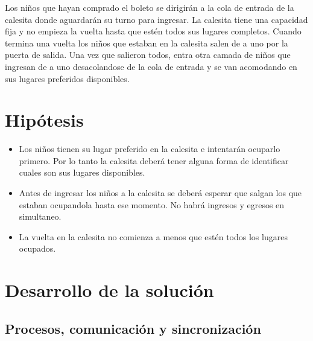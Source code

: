 \documentclass[a4paper,10pt]{article}
\begin{document}
Los niños que hayan comprado el boleto se dirigirán a la cola de entrada de la calesita donde aguardarán su turno para ingresar.
La calesita tiene una capacidad fija y no empieza la vuelta hasta que estén todos sus lugares completos.
Cuando termina una vuelta los niños que estaban en la calesita salen de a uno por la puerta de salida. Una vez que salieron todos, entra otra camada de niños que ingresan de a uno desacolandose de la cola de entrada y se van acomodando en sus lugares preferidos disponibles.


\section{Hipótesis}

\begin{itemize}
\item Los niños tienen su lugar preferido en la calesita e intentarán ocuparlo primero. Por lo tanto la calesita deberá tener alguna forma de identificar cuales son sus lugares disponibles.
\item Antes de ingresar los niños a la calesita se deberá esperar que salgan los que estaban ocupandola hasta ese momento. No habrá ingresos y egresos en simultaneo.
\item La vuelta en la calesita no comienza a menos que estén todos los lugares ocupados.
\end{itemize}

\clearpage
\section{Desarrollo de la solución}

\subsection{Procesos, comunicación y sincronización}
\end{document}
